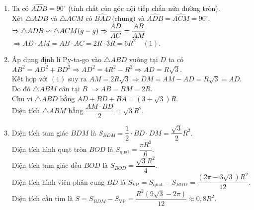 \begin{bt}
{\begin{enumerate}
			\item Ta có $\widehat{ADB} = 90^\circ$ (tính chất của góc nội tiếp chắn nửa đường tròn).\\
			Xét $\triangle ADB$ và $\triangle ACM$ có $\widehat{BAD} \, \text{(chung)}$ và $\widehat{ADB}= \widehat{ACM} =90^\circ.$\\
			$\Rightarrow \triangle ADB \backsim \triangle ACM \text({g-g})\Rightarrow \dfrac{AD}{AC} = \dfrac{AB}{AM}$\\
			$\Rightarrow AD\cdot AM = AB\cdot AC = 2R \cdot 3R = 6R^2 \quad (1)$.
			\item Áp dụng định lí Py-ta-go vào $\triangle ABD$ vuông tại $D$ ta có $AB^2 = AD^2 + BD^2 \Rightarrow AD^2 = 4R^2 - R^2 \Rightarrow AD  = R \sqrt{3}$.\\
			Kết hợp với $(1)$ suy ra $AM = 2R\sqrt{3} \Rightarrow DM = AM - AD = R\sqrt{3} = AD$. Do đó $\triangle ABM$ cân tại $B$ $\Rightarrow AB = BM = 2R$.\\
			Chu vi $\triangle ABD$ bằng $AD + BD + BA = (3+\sqrt{3})R$.\\
			Diện tích $\triangle ABM$ bằng $\dfrac{AM\cdot BD}{2} = \sqrt{3}R^2$.
			\item Diện tích tam giác $BDM$ là $S_{BDM} = \dfrac{1}{2}\cdot BD \cdot DM = \dfrac{\sqrt{3}}{2}R^2$.\\
			Diện tích hình quạt tròn $BOD$ là $S_{\text{quạt}} = \dfrac{\pi R^2}{6}$.\\
			Diện tích tam giác đều $BOD$ là $S_{BOD} = \dfrac{\sqrt{3}R^2}{4}$.\\
			Diện tích hình viên phân cung $BD$ là $S_{\text{VP}} = S_{\text{quạt}} - S_{BOD}= \dfrac{(2\pi - 3\sqrt{3})R^2}{12}$.\\
			Diện tích cần tìm là $S = S_{BDM} - S_{\text{VP}} = \dfrac{R^2(9\sqrt{3} - 2\pi)}{12} \approx 0{,}8 R^2$.
	\end{enumerate}
}
\end{bt}

